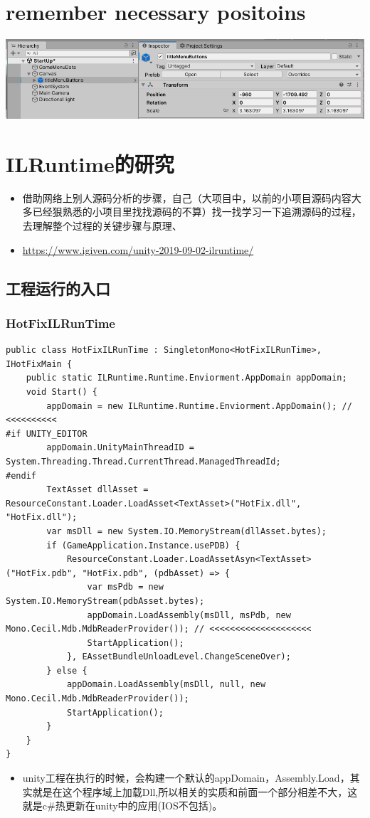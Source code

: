 \documentclass[9pt, b5paper]{article}
\begin{document}
\section{remember necessary positoins}
\label{sec-9}

\includegraphics[width=.9\linewidth]{./pic/readme_20220930_204953.png}



\section{ILRuntime的研究}
\label{sec-10}
\begin{itemize}
\item 借助网络上别人源码分析的步骤，自己（大项目中，以前的小项目源码内容大多已经狠熟悉的小项目里找找源码的不算）找一找学习一下追溯源码的过程，去理解整个过程的关键步骤与原理、
\item \url{https://www.igiven.com/unity-2019-09-02-ilruntime/}
\end{itemize}
\subsection{工程运行的入口}
\label{sec-10-1}
\subsubsection{HotFixILRunTime}
\label{sec-10-1-1}
\begin{verbatim}
public class HotFixILRunTime : SingletonMono<HotFixILRunTime>, IHotFixMain {
    public static ILRuntime.Runtime.Enviorment.AppDomain appDomain;
    void Start() {
        appDomain = new ILRuntime.Runtime.Enviorment.AppDomain(); // <<<<<<<<<< 
#if UNITY_EDITOR
        appDomain.UnityMainThreadID = System.Threading.Thread.CurrentThread.ManagedThreadId;
#endif
        TextAsset dllAsset = ResourceConstant.Loader.LoadAsset<TextAsset>("HotFix.dll", "HotFix.dll");
        var msDll = new System.IO.MemoryStream(dllAsset.bytes);
        if (GameApplication.Instance.usePDB) {
            ResourceConstant.Loader.LoadAssetAsyn<TextAsset>("HotFix.pdb", "HotFix.pdb", (pdbAsset) => {
                var msPdb = new System.IO.MemoryStream(pdbAsset.bytes);
                appDomain.LoadAssembly(msDll, msPdb, new Mono.Cecil.Mdb.MdbReaderProvider()); // <<<<<<<<<<<<<<<<<<<< 
                StartApplication();
            }, EAssetBundleUnloadLevel.ChangeSceneOver);
        } else {
            appDomain.LoadAssembly(msDll, null, new Mono.Cecil.Mdb.MdbReaderProvider());
            StartApplication();
        }
    }
}
\end{verbatim}
\begin{itemize}
\item unity工程在执行的时候，会构建一个默认的appDomain，Assembly.Load，其实就是在这个程序域上加载Dll,所以相关的实质和前面一个部分相差不大，这就是c\#热更新在unity中的应用(IOS不包括)。
\end{itemize}
\end{document}
